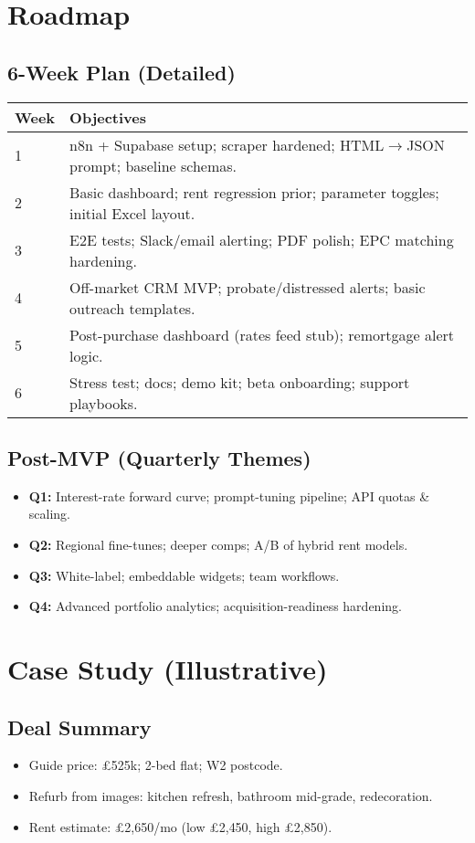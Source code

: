 \documentclass[12pt,a4paper]{article}
\begin{document}
\section{Roadmap}
\subsection{6-Week Plan (Detailed)}
\begin{longtable}{@{}p{2cm}p{13.6cm}@{}}
\toprule
\textbf{Week} & \textbf{Objectives} \\
\midrule
1 & n8n + Supabase setup; scraper hardened; HTML$\to$JSON prompt; baseline schemas. \\
2 & Basic dashboard; rent regression prior; parameter toggles; initial Excel layout. \\
3 & E2E tests; Slack/email alerting; PDF polish; EPC matching hardening. \\
4 & Off-market CRM MVP; probate/distressed alerts; basic outreach templates. \\
5 & Post-purchase dashboard (rates feed stub); remortgage alert logic. \\
6 & Stress test; docs; demo kit; beta onboarding; support playbooks. \\
\bottomrule
\end{longtable}

\subsection{Post-MVP (Quarterly Themes)}
\begin{itemize}[leftmargin=1.5em]
  \item \textbf{Q1:} Interest-rate forward curve; prompt-tuning pipeline; API quotas \& scaling.
  \item \textbf{Q2:} Regional fine-tunes; deeper comps; A/B of hybrid rent models.
  \item \textbf{Q3:} White-label; embeddable widgets; team workflows.
  \item \textbf{Q4:} Advanced portfolio analytics; acquisition-readiness hardening.
\end{itemize}

\section{Case Study (Illustrative)}
\subsection{Deal Summary}
\begin{itemize}[leftmargin=1.5em]
  \item Guide price: \pounds525k; 2-bed flat; W2 postcode.
  \item Refurb from images: kitchen refresh, bathroom mid-grade, redecoration.
  \item Rent estimate: \pounds2{,}650/mo (low \pounds2{,}450, high \pounds2{,}850).
\end{itemize}
\end{document}
